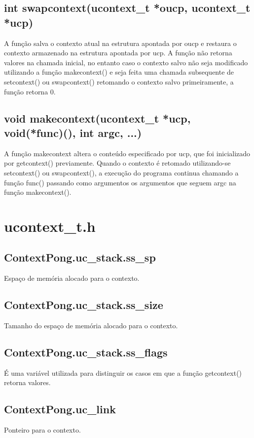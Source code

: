 \documentclass[12pt]{article}
\begin{document}
	
	\subsection{int swapcontext(ucontext\_t *oucp, ucontext\_t *ucp)}
	A função salva o contexto atual na estrutura apontada por oucp e restaura o contexto armazenado na estrutura apontada por ucp. A função não retorna valores na chamada inicial, no entanto caso o contexto salvo não seja modificado utilizando a função makecontext() e seja feita uma chamada subsequente de setcontext() ou swapcontext() retomando o contexto salvo primeiramente, a função retorna 0.
	
	
	\subsection{void makecontext(ucontext\_t *ucp, void(*func)(), int argc, ...)}
	A função makecontext altera o conteúdo especificado por ucp, que foi inicializado por getcontext() previamente. Quando o contexto é retomado utilizando-se setcontext() ou swapcontext(), a execução do programa continua chamando a função func() passando como argumentos os argumentos que seguem argc na função makecontext().

\section{ucontext\_t.h}
\subsection{ContextPong.uc\_stack.ss\_sp}
Espaço de memória alocado para o contexto.


\subsection{ContextPong.uc\_stack.ss\_size}
Tamanho do espaço de memória alocado para o contexto.


\subsection{ContextPong.uc\_stack.ss\_flags}
É uma variável utilizada para distinguir os casos em que a função getcontext() retorna valores.


\subsection{ContextPong.uc\_link}
Ponteiro para o contexto.
\end{document}
